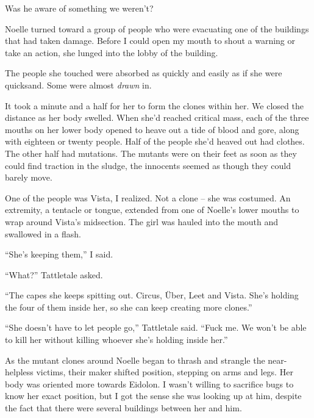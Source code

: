 Was he aware of something we weren't?



Noelle turned toward a group of people who were evacuating one of the buildings that had taken damage.  Before I could open my mouth to shout a warning or take an action, she lunged into the lobby of the building.



The people she touched were absorbed as quickly and easily as if she were quicksand.  Some were almost \emph{drawn} in.



It took a minute and a half for her to form the clones within her.  We closed the distance as her body swelled.  When she'd reached critical mass, each of the three mouths on her lower body opened to heave out a tide of blood and gore, along with eighteen or twenty people.  Half of the people she'd heaved out had clothes.  The other half had mutations.  The mutants were on their feet as soon as they could find traction in the sludge, the innocents seemed as though they could barely move.



One of the people was Vista, I realized.  Not a clone – she was costumed.  An extremity, a tentacle or tongue, extended from one of Noelle's lower mouths to wrap around Vista's midsection.  The girl was hauled into the mouth and swallowed in a flash.



``She's keeping them,'' I said.



``What?'' Tattletale asked.



``The capes she keeps spitting out.  Circus, \"{U}ber, Leet and Vista.  She's holding the four of them inside her, so she can keep creating more clones.''



``She doesn't have to let people go,'' Tattletale said.  ``Fuck me.  We won't be able to kill her without killing whoever she's holding inside her.''



As the mutant clones around Noelle began to thrash and strangle the near-helpless victims, their maker shifted position, stepping on arms and legs.  Her body was oriented more towards Eidolon.  I wasn't willing to sacrifice bugs to know her exact position, but I got the sense she was looking up at him, despite the fact that there were several buildings between her and him.



